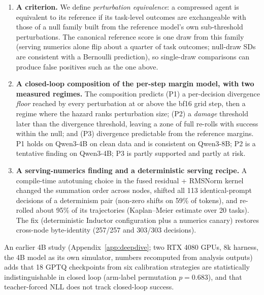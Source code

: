 \begin{enumerate}[leftmargin=*,itemsep=1pt,topsep=2pt]
\item \textbf{A criterion.} We define \emph{perturbation equivalence}: a compressed agent is equivalent to its reference if its task-level outcomes are exchangeable with those of a null family built from the reference model's own sub-threshold perturbations. The canonical reference score is one draw from this family (serving numerics alone flip about a quarter of task outcomes; null-draw SDs are consistent with a Bernoulli prediction), so single-draw comparisons can produce false positives such as the one above.
\item \textbf{A closed-loop composition of the per-step margin model, with two measured regimes.} The composition predicts (P1) a per-decision divergence \emph{floor} reached by every perturbation at or above the bf16 grid step, then a regime where the hazard ranks perturbation size; (P2) a \emph{damage} threshold later than the divergence threshold, leaving a zone of full re-rolls with success within the null; and (P3) divergence predictable from the reference margins. P1 holds on Qwen3-4B on clean data and is consistent on Qwen3-8B; P2 is a tentative finding on Qwen3-4B; P3 is partly supported and partly at risk.
\item \textbf{A serving-numerics finding and a deterministic serving recipe.} A compile-time autotuning choice in the fused residual + RMSNorm kernel changed the summation order across nodes, shifted all 113 identical-prompt decisions of a determinism pair (non-zero shifts on 59\% of tokens), and re-rolled about 95\% of its trajectories (Kaplan--Meier estimate over 20 tasks). The fix (deterministic Inductor configuration plus a numerics canary) restores cross-node byte-identity (257/257 and 303/303 decisions).
\end{enumerate}

\noindent An earlier 4B study (Appendix~\ref{app:deepdive}; two RTX 4080 GPUs, 8k harness, the 4B model as its own simulator, numbers recomputed from analysis outputs) adds that 18 GPTQ checkpoints from six calibration strategies are statistically indistinguishable in closed loop (arm-label permutation $p = 0.683$), and that teacher-forced NLL does not track closed-loop success.
